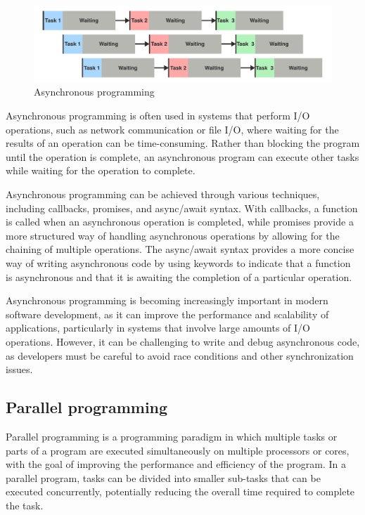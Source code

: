 \begin{figure}[H]
    \centering
    \includegraphics[width=\textwidth]{figures/concurrency/concurrent.pdf}
    \caption{Asynchronous programming}
    \label{fig:concurrency_concurrent}
\end{figure}

Asynchronous programming is often used in systems that perform I/O operations, such as network communication or file I/O, where waiting for the results of an operation can be time-consuming.
Rather than blocking the program until the operation is complete, an asynchronous program can execute other tasks while waiting for the operation to complete.

Asynchronous programming can be achieved through various techniques, including callbacks, promises, and async/await syntax.
With callbacks, a function is called when an asynchronous operation is completed, while promises provide a more structured way of handling asynchronous operations by allowing for the chaining of multiple operations.
The async/await syntax provides a more concise way of writing asynchronous code by using keywords to indicate that a function is asynchronous and that it is awaiting the completion of a particular operation.

Asynchronous programming is becoming increasingly important in modern software development, as it can improve the performance and scalability of applications, particularly in systems that involve large amounts of I/O operations.
However, it can be challenging to write and debug asynchronous code, as developers must be careful to avoid race conditions and other synchronization issues.

\subsection{Parallel programming}


Parallel programming is a programming paradigm in which multiple tasks or parts of a program are executed simultaneously on multiple processors or cores, with the goal of improving the performance and efficiency of the program.
In a parallel program, tasks can be divided into smaller sub-tasks that can be executed concurrently, potentially reducing the overall time required to complete the task.

